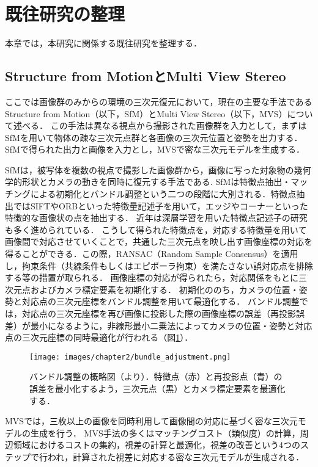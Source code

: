 \section{既往研究の整理}\label{sec:researches}
本章では，本研究に関係する既往研究を整理する．\par
\subsection{Structure from MotionとMulti View Stereo}\label{subsec:Sfm_and_MVS}
ここでは画像群のみからの環境の三次元復元において，現在の主要な手法であるStructure from Motion（以下，SfM）とMulti View Stereo（以下，MVS）について述べる．
この手法は異なる視点から撮影された画像群を入力として，まずはSfMを用いて物体の疎な三次元点群と各画像の三次元位置と姿勢を出力する．
SfMで得られた出力と画像を入力とし，MVSで密な三次元モデルを生成する．\par

SfMは，被写体を複数の視点で撮影した画像群から，画像に写った対象物の幾何学的形状とカメラの動きを同時に復元する手法である\cite{sfm_JP}.
SfMは特徴点抽出・マッチングによる初期化とバンドル調整という二つの段階に大別される．特徴点抽出ではSIFT\cite{SIFT}やORB\cite{ORB}といった特徴量記述子を用いて，エッジやコーナーといった特徴的な画像状の点を抽出する．
近年は深層学習を用いた特徴点記述子の研究も多く進められている．
こうして得られた特徴点を，対応する特徴量を用いて画像間で対応させていくことで，共通した三次元点を映し出す画像座標の対応を得ることができる．この際，RANSAC（Random Sample Consensus）\cite{RANSAC}を適用し，拘束条件（共線条件もしくはエピポーラ拘束）を満たさない誤対応点を排除する等の措置が取られる．
画像座標の対応が得られたら，対応関係をもとに三次元点およびカメラ標定要素を初期化する．
初期化ののち，カメラの位置・姿勢と対応点の三次元座標をバンドル調整を用いて最適化する．
バンドル調整では，対応点の三次元座標を再び画像に投影した際の画像座標の誤差（再投影誤差）が最小になるように，非線形最小二乗法によってカメラの位置・姿勢と対応点の三次元座標の同時最適化が行われる（図\ref{fig:bundle_adjustment}）．\par
\begin{figure}[h]
  \centering
  \texttt{[image: images/chapter2/bundle\_adjustment.png]}
  \caption[バンドル調整の概略図]{バンドル調整の概略図（\cite{bundle_adjustment}より）．特徴点（赤）と再投影点（青）の誤差を最小化するよう，三次元点（黒）とカメラ標定要素を最適化する．}
  \label{fig:bundle_adjustment}
\end{figure}
MVSでは，三枚以上の画像を同時利用して画像間の対応に基づく密な三次元モデルの生成を行う．
MVS手法の多くはマッチングコスト（類似度）の計算，周辺領域におけるコストの集約，視差の計算と最適化，視差の改善という4つのステップで行われ\cite{mvs}，計算された視差に対応する密な三次元モデルが生成される．\par

